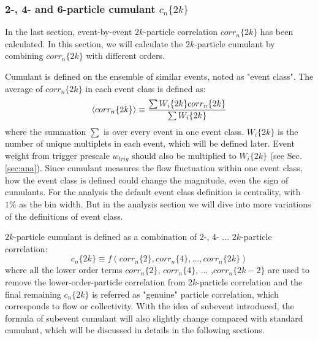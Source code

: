 \subsubsection{2-, 4- and 6-particle cumulant $c_n\{2k\}$}
In the last section, event-by-event $2k$-particle correlation $corr_n\{2k\}$ has been calculated. In this section, we will calculate the $2k$-particle cumulant by combining $corr_n\{2k\}$ with different orders.

Cumulant is defined on the ensemble of similar events, noted as "event class". The average of $corr_n\{2k\}$ in each event class is defined as:
\begin{equation}
\left\langle corr_n\{2k\}\right\rangle\equiv\frac{\sum W_i\{2k\}corr_n\{2k\}}{\sum W_i\{2k\}}
\end{equation}
where the summation $\sum$ is over every event in one event class. $W_i\{2k\}$ is the number of unique multiplets in each event, which will be defined later. Event weight from trigger prescale $w_{trig}$ should also be multiplied to $W_{i}\{2k\}$ (see Sec.\ref{sec:ana}). Since cumulant measures the flow fluctuation within one event class, how the event class is defined could change the magnitude, even the sign of cumulants. For the analysis the default event class definition is centrality, with $1\%$ as the bin width. But in the analysis section we will dive into more variations of the definitions of event class.

$2k$-particle cumulant is defined as a combination of 2-, 4- ... $2k$-particle correlation:
\begin{equation}
c_n\{2k\}\equiv f(corr_n\{2\},corr_n\{4\}, ... ,corr_n\{2k\})
\end{equation}
where all the lower order terms $corr_n\{2\}$, $corr_n\{4\}$, ... ,$corr_n\{2k-2\}$ are used to remove the lower-order-particle correlation from $2k$-particle correlation and the final remaining $c_n\{2k\}$ is referred as "genuine" particle correlation, which corresponds to flow or collectivity. With the idea of subevent introduced, the formula of subevent cumulant will also slightly change compared with standard cumulant, which will be discussed in details in the following sections.



